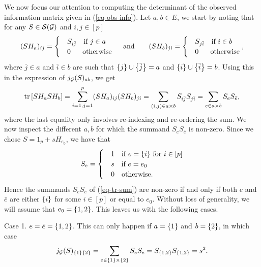 
We now focus our attention to computing the determinant of the observed information matrix given in (\ref{eq-obs-info}). Let $a, b \in E$, we start by noting that for any $S \in {\mathcal{S}}({\mathcal{G}})$ and $i, j \in [p]$
\begin{equation*}
    (SH_a)_{ij} = \begin{cases}
        & S_{i \bar j}\ \ \t{ if } j \in a\\
        &0\ \ \ \ \  \t{otherwise}
    \end{cases}
    \ \ \ \t{ and }\ \ \ \ \ 
    (SH_b)_{ji} = \begin{cases}
        & S_{j \bar i}\ \ \t{ if } i \in b\\
        &0\ \ \ \ \  \t{otherwise}
    \end{cases},
\end{equation*}
where $\bar j \in a$ and $\bar i \in b$ are such that ${\left\{j\right\}} \cup {\left\{\bar j\right\}} = a$ and ${\left\{i\right\}} \cup {\left\{\bar i\right\}} = b$. Using this in the expression of $j_{\mathcal{G}}(S)_{ab}$, we get
\begin{equation} \label{eq-tr-sum}
    {\textrm{tr}\left[SH_aSH_b\right]} = \sum_{i=1, j=1}^p (SH_a)_{ij}(SH_b)_{ji} = \sum_{(i, j) \in a \times b} S_{i \bar j} S_{j \bar i} = \sum_{e \in a \times b} S_e S_{\bar e},
\end{equation}
where the last equality only involves re-indexing and re-ordering the sum. We now inspect the different $a, b$ for which the summand $S_eS_{\bar e}$ is non-zero. Since we chose $S = 1_p + s H_{e_0}$, we have that
\begin{equation*}
    S_e = \begin{cases}
        &1\ \ {\textrm{ if }} e = {\left\{ i \right\}} {\textrm{ for }} i \in [p]\\
        &s\ \ {\textrm{ if }} e = e_0\\
        &0\ \ {\textrm{ otherwise}}.
    \end{cases}
\end{equation*}
Hence the summands $S_e S_{\bar e}$ of (\ref{eq-tr-sum}) are non-zero if and only if both $e$ and $\bar e$ are either ${\left\{i\right\}}$ for some $i \in [p]$ or equal to $e_0$. Without loss of generality, we will assume that $e_0 = {\left\{1, 2\right\}}$. This leaves us with the following cases. 

Case 1. $e = \bar e = {\left\{1, 2\right\}}$. This can only happen if $a = {\left\{1\right\}}$ and $b = {\left\{2\right\}}$, in which case
\begin{equation*}
    j_{\mathcal{G}}(S)_{{\left\{1\right\}} {\left\{2\right\}}} = \sum_{e \in {\left\{1\right\}} \times {\left\{2\right\}}} S_e S_{\bar e} = S_{{\left\{1, 2\right\}}}S_{{\left\{1, 2\right\}}} = s^2.
\end{equation*}

